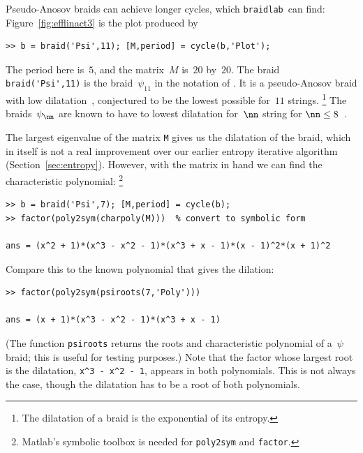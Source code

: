 \documentclass[12pt]{article}
\newcommand{\braidlab}{\texttt{braidlab}}%
\newcommand{\braid}{\texttt{braid}}%
\begin{document}
Pseudo-Anosov braids %
%
can achieve longer cycles, which \braidlab\ can find:
Figure~\ref{fig:efflinact3} is the plot produced by
\begin{lstlisting}[frame=single,framerule=0pt]
>> b = braid('Psi',11); [M,period] = cycle(b,'Plot');
\end{lstlisting}
The period here is~$5$, and the matrix~$M$ is~$20$ by~$20$.  The braid %
%
%
\lstinline{braid('Psi',11)} is the braid~$\psi_{11}$ in the notation of
\citet{Venzke_thesis}.  It is a pseudo-Anosov braid with low %
%
%
dilatation~\citep{Hironaka2006,Thiffeault2006}, conjectured to be the lowest
possible for~$11$ strings.%
%
\footnote{The dilatation of a braid is the exponential of its entropy.}
%
The braids~$\psi_\nn$ are known to have to lowest dilatation for~$\nn$ string
for $\nn\le8$~\citep{LanneauThiffeault2011_braids}.

The largest eigenvalue of the matrix \lstinline{M} gives us the
%
dilatation of the braid, which in itself is not a real improvement over our
earlier entropy iterative algorithm (Section~\ref{sec:entropy}).  However,
with the matrix in hand we can find the characteristic polynomial:%
\footnote{Matlab's symbolic toolbox %
%
is needed for \lstinline{poly2sym} and \lstinline{factor}.}
\begin{lstlisting}[frame=single,framerule=0pt]
>> b = braid('Psi',7); [M,period] = cycle(b);
>> factor(poly2sym(charpoly(M)))  % convert to symbolic form

ans = (x^2 + 1)*(x^3 - x^2 - 1)*(x^3 + x - 1)*(x - 1)^2*(x + 1)^2
\end{lstlisting}
\index{braid class@\braid\ class!cycle@\lstinline{cycle}|)}%
Compare this to the known polynomial that gives the dilation:
\begin{lstlisting}[frame=single,framerule=0pt]
>> factor(poly2sym(psiroots(7,'Poly')))

ans = (x + 1)*(x^3 - x^2 - 1)*(x^3 + x - 1)
\end{lstlisting}
(The function \lstinline{psiroots} returns the roots and characteristic
polynomial of a~$\psi$ braid; this is useful for testing purposes.)  Note that
the factor whose largest root is the dilatation, %
%
\lstinline{x^3 - x^2 - 1}, appears in both polynomials.  This is not always
the case, though the dilatation has to be a root of both polynomials.
%
\end{document}
